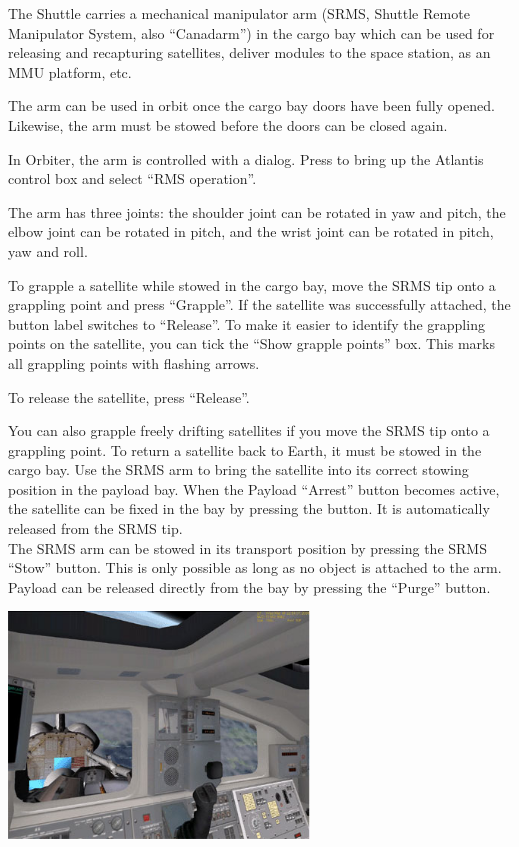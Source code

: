 The Shuttle carries a mechanical manipulator arm (SRMS, Shuttle Remote Manipulator System, also “Canadarm”) in the cargo bay which can be used for releasing and recapturing satellites, deliver modules to the space station, as an MMU platform, etc.

The arm can be used in orbit once the cargo bay doors have been fully opened. Likewise, the arm must be stowed before the doors can be closed again.

In Orbiter, the arm is controlled with a dialog. Press  to bring up the Atlantis control box and select “RMS operation”.

The arm has three joints: the shoulder joint can be rotated in yaw and pitch, the elbow joint can be rotated in pitch, and the wrist joint can be rotated in pitch, yaw and roll.

To grapple a satellite while stowed in the cargo bay, move the SRMS tip onto a grappling point and press “Grapple”. If the satellite was successfully attached, the button label switches to “Release”. To make it easier to identify the grappling points on the satellite, you can tick the “Show grapple points” box. This marks all grappling points with flashing arrows.

To release the satellite, press “Release”.

You can also grapple freely drifting satellites if you move the SRMS tip onto a grappling point. To return a satellite back to Earth, it must be stowed in the cargo bay. Use the SRMS arm to bring the satellite into its correct stowing position in the payload bay. When the Payload “Arrest” button becomes active, the satellite can be fixed in the bay by pressing the button. It is automatically released from the SRMS tip.\\

The SRMS arm can be stowed in its transport position by pressing the SRMS “Stow” button. This is only possible as long as no object is attached to the arm. Payload can be released directly from the bay by pressing the “Purge” button.
\begin{center}
\includegraphics[width=0.6\textwidth]{Images//Pic9.jpg}
\end{center}

